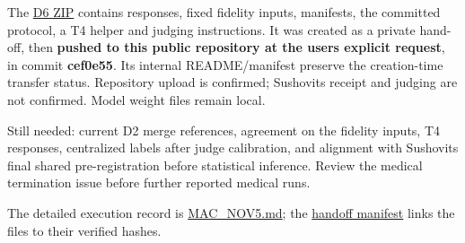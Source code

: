 \documentclass[11pt,a4paper]{article}
\begin{document}
The
\href{https://github.com/SushovitNanda/Lexsi_Hackathon/blob/manishshaw/models/local-results/day2/D6_Manish_2026-11-05.zip}{D6
ZIP} contains responses, fixed fidelity inputs, manifests, the committed
protocol, a T4 helper and judging instructions. It was created as a
private hand-off, then \textbf{pushed to this public repository at the
user\textquotesingle s explicit request}, in commit \textbf{cef0e55}.
Its internal README/manifest preserve the creation-time transfer status.
Repository upload is confirmed; Sushovit\textquotesingle s receipt and
judging are not confirmed. Model weight files remain local.

Still needed: current D2 merge references, agreement on the fidelity
inputs, T4 responses, centralized labels after judge calibration, and
alignment with Sushovit\textquotesingle s final shared pre-registration
before statistical inference. Review the medical termination issue
before further reported medical runs.

The detailed execution record is
\href{https://github.com/SushovitNanda/Lexsi_Hackathon/blob/manishshaw/MAC_NOV5.md}{MAC\_NOV5.md};
the
\href{https://github.com/SushovitNanda/Lexsi_Hackathon/blob/manishshaw/results/mac/day2_handoff.json}{handoff
manifest} links the files to their verified hashes.
\end{document}
